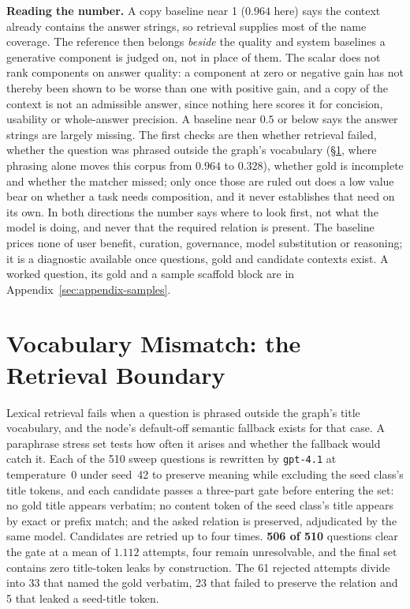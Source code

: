 \documentclass[10pt,twocolumn]{article}
\begin{document}
\textbf{Reading the number.} A copy baseline near 1 ($0.964$ here) says the context already contains the answer strings, so retrieval supplies most of the name coverage. The reference then belongs \emph{beside} the quality and system baselines a generative component is judged on, not in place of them. The scalar does not rank components on answer quality: a component at zero or negative gain has not thereby been shown to be worse than one with positive gain, and a copy of the context is not an admissible answer, since nothing here scores it for concision, usability or whole-answer precision. A baseline near $0.5$ or below says the answer strings are largely missing. The first checks are then whether retrieval failed, whether the question was phrased outside the graph's vocabulary (\S\ref{sec:paraphrase}, where phrasing alone moves this corpus from $0.964$ to $0.328$), whether gold is incomplete and whether the matcher missed; only once those are ruled out does a low value bear on whether a task needs composition, and it never establishes that need on its own. In both directions the number says where to look first, not what the model is doing, and never that the required relation is present. The baseline prices none of user benefit, curation, governance, model substitution or reasoning; it is a diagnostic available once questions, gold and candidate contexts exist. A worked question, its gold and a sample scaffold block are in Appendix~\ref{sec:appendix-samples}.

\section{Vocabulary Mismatch: the Retrieval Boundary}\label{sec:paraphrase}
Lexical retrieval fails when a question is phrased outside the graph's title vocabulary, and the
node's default-off semantic fallback exists for that case. A paraphrase stress set tests how often
it arises and whether the fallback would catch it. Each of the 510 sweep questions is rewritten by \texttt{gpt-4.1} at temperature~0 under seed~42
to preserve meaning while excluding the seed class's title tokens, and each candidate passes a
three-part gate before entering the set: no gold title appears verbatim; no content token of the seed
class's title appears by exact or prefix match; and the asked relation is preserved, adjudicated by
the same model. Candidates are retried up to four times. \textbf{506 of 510} questions clear the gate
at a mean of $1.112$ attempts, four remain unresolvable, and the final set contains zero title-token
leaks by construction. The 61 rejected attempts divide into 33 that named the gold verbatim, 23 that
failed to preserve the relation and 5 that leaked a seed-title token.
\end{document}
